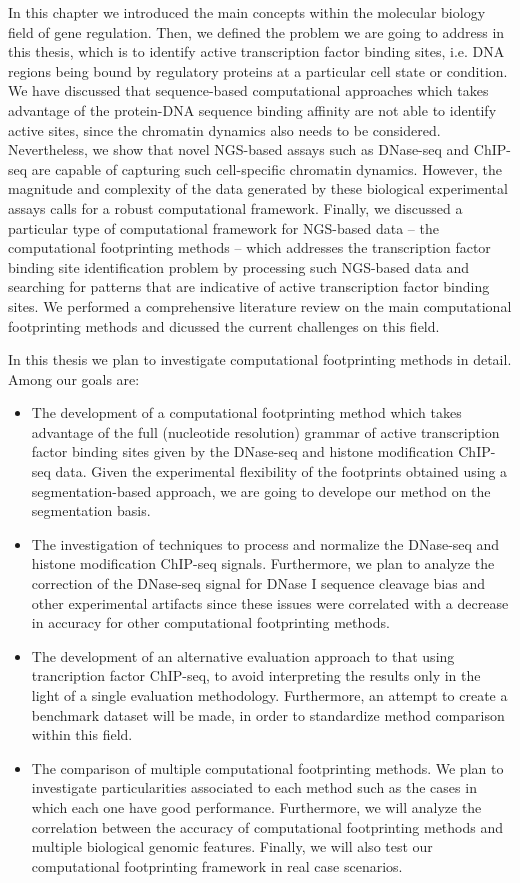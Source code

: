 In this chapter we introduced the main concepts within the molecular biology field of gene regulation. Then, we defined the problem we are going to address in this thesis, which is to identify active transcription factor binding sites, i.e. DNA regions being bound by regulatory proteins at a particular cell state or condition. We have discussed that sequence-based computational approaches which takes advantage of the protein-DNA sequence binding affinity are not able to identify active sites, since the chromatin dynamics also needs to be considered. Nevertheless, we show that novel NGS-based assays such as DNase-seq and ChIP-seq are capable of capturing such cell-specific chromatin dynamics. However, the magnitude and complexity of the data generated by these biological experimental assays calls for a robust computational framework. Finally, we discussed a particular type of computational framework for NGS-based data -- the computational footprinting methods -- which addresses the transcription factor binding site identification problem by processing such NGS-based data and searching for patterns that are indicative of active transcription factor binding sites. We performed a comprehensive literature review on the main computational footprinting methods and dicussed the current challenges on this field.

In this thesis we plan to investigate computational footprinting methods in detail. Among our goals are:
\begin{itemize}
\item The development of a computational footprinting method which takes advantage of the full (nucleotide resolution) grammar of active transcription factor binding sites given by the DNase-seq and histone modification ChIP-seq data. Given the experimental flexibility of the footprints obtained using a segmentation-based approach, we are going to develope our method on the segmentation basis.
\item The investigation of techniques to process and normalize the DNase-seq and histone modification ChIP-seq signals. Furthermore, we plan to analyze the correction of the DNase-seq signal for DNase I sequence cleavage bias and other experimental artifacts since these issues were correlated with a decrease in accuracy for other computational footprinting methods.
\item The development of an alternative evaluation approach to that using trancription factor ChIP-seq, to avoid interpreting the results only in the light of a single evaluation methodology. Furthermore, an attempt to create a benchmark dataset will be made, in order to standardize method comparison within this field.
\item The comparison of multiple computational footprinting methods. We plan to investigate particularities associated to each method such as the cases in which each one have good performance. Furthermore, we will analyze the correlation between the accuracy of computational footprinting methods and multiple biological genomic features. Finally, we will also test our computational footprinting framework in real case scenarios.
\end{itemize}


